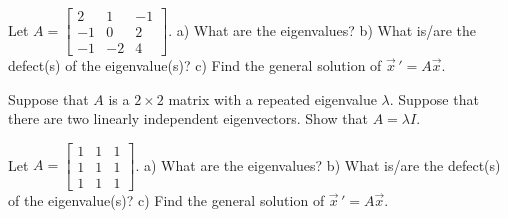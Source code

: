 \documentclass[12pt]{book}
\begin{document}
\begin{exercise}
Let
$A = \left[ \begin{smallmatrix}
2 & 1 & -1 \\
-1 & 0 & 2 \\
-1 & -2 & 4
\end{smallmatrix} \right]$.
a) What are the eigenvalues?
b) What is/are the defect(s) of the eigenvalue(s)?
c) Find the general solution of ${\vec{x}\,}' = A \vec{x}$.
\end{exercise}

\begin{exercise}
Suppose that $A$ is a $2 \times 2$ matrix with a repeated eigenvalue
$\lambda$.
Suppose that there are two linearly independent eigenvectors.  Show that
$A = \lambda I$.
\end{exercise}

\setcounter{exercise}{100}

\begin{exercise}
Let $A =
\left[ \begin{smallmatrix}
1 & 1 & 1 \\
1 & 1 & 1 \\
1 & 1 & 1 
\end{smallmatrix}\right]$.  
a) What are the eigenvalues?  b) What is/are the defect(s) of the
eigenvalue(s)?  c) Find the general solution of $\vec{x}\,' = A\vec{x}$.
\end{exercise}
\end{document}
